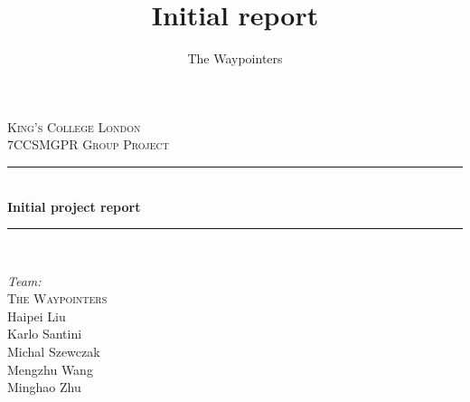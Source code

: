 \documentclass[a4paper,12pt]{article}
\title{Initial report}
\author{The Waypointers}
\begin{document}
%
%
%

\begin{titlepage}

\newcommand{\HRule}{\rule{\linewidth}{0.5mm}} %

\center %
 

\textsc{\LARGE King's College London}\\[1.5cm] %
\textsc{\Large 7CCSMGPR Group Project}\\[0.5cm] %


\HRule \\[0.4cm]
{ \huge \bfseries Initial project report}\\[0.4cm] %
\HRule \\[1.5cm]
 
\begin{flushleft}
{\Large \emph{Team:}\\
\textsc{The Waypointers}\\}
Haipei Liu\\
Karlo Santini\\
Michal Szewczak\\
Mengzhu Wang\\
Minghao Zhu\\[3cm]
\end{flushleft}


\end{titlepage}
\end{document}
